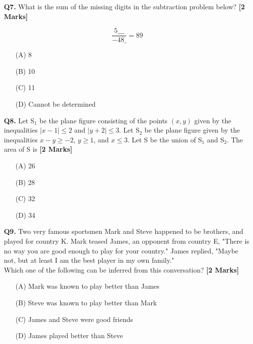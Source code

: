 \documentclass[11pt]{article}
\newcommand{\questionb}[2]{
    \noindent\textbf{Q#2.} #1 \hfill \textbf{[2 Marks]}
}
\begin{document}
\questionb{What is the sum of the missing digits in the subtraction problem below?}{7}
\[
\frac{5\_\_\_}{-48\_} = 89
\]
\begin{enumerate}
    \item[(A)] 8  
    \item[(B)] 10  
    \item[(C)] 11  
    \item[(D)] Cannot be determined  
\end{enumerate}
\vspace{0.5cm}

\questionb{Let S$_1$ be the plane figure consisting of the points $(x, y)$ given by the inequalities $|x - 1| \leq 2$ and $|y + 2| \leq 3$. Let S$_2$ be the plane figure given by the inequalities $x - y \geq -2$, $y \geq 1$, and $x \leq 3$. Let S be the union of S$_1$ and S$_2$. The area of S is}{8}
\begin{enumerate}
    \item[(A)] 26  
    \item[(B)] 28  
    \item[(C)] 32  
    \item[(D)] 34  
\end{enumerate}
\vspace{0.5cm}

\questionb{Two very famous sportsmen Mark and Steve happened to be brothers, and played for country K. Mark teased James, an opponent from country E, "There is no way you are good enough to play for your country." James replied, "Maybe not, but at least I am the best player in my own family."\\ 
Which one of the following can be inferred from this conversation?}{9}
\begin{enumerate}
    \item [(A)] Mark was known to play better than James
    \item[(B)] Steve was known to play better than Mark
    \item[(C)] James and Steve were good friends
    \item[(D)] James played better than Steve 
\end{enumerate}
\vspace{0.5cm}
\end{document}
